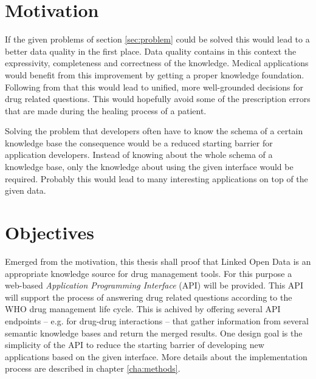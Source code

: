\section{Motivation}
\label{sec:motivation}

If the given problems of section \ref{sec:problem} could be solved this would lead to a better data quality in the first place.
Data quality contains in this context the expressivity, completeness and correctness of the knowledge.
Medical applications would benefit from this improvement by getting a proper knowledge foundation.
Following from that this would lead to unified, more well-grounded decisions for drug related questions.
This would hopefully avoid some of the prescription errors that are made during the healing process of a patient.

Solving the problem that developers often have to know the schema of a certain knowledge base the consequence would be a reduced starting barrier for application developers.
Instead of knowing about the whole schema of a knowledge base, only the knowledge about using the given interface would be required.
Probably this would lead to many interesting applications on top of the given data.


\section{Objectives}
\label{sec:objectives}

Emerged from the motivation, this thesis shall proof that Linked Open Data is an appropriate knowledge source for drug management tools.
For this purpose a web-based \textit{Application Programming Interface} (API) will be provided.
This API will support the process of answering drug related questions according to the WHO drug management life cycle.
This is achived by offering several API endpoints -- e.g. for drug-drug interactions -- that gather information from several semantic knowledge bases and return the merged results.
One design goal is the simplicity of the API to reduce the starting barrier of developing new applications based on the given interface.
More details about the implementation process are described in chapter \ref{cha:methods}.

